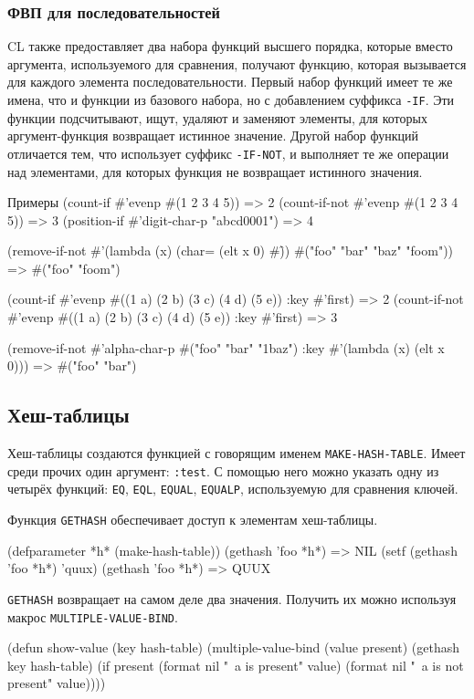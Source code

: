 \subsubsection{ФВП для последовательностей}
CL также предоставляет два набора функций высшего порядка, которые вместо аргумента, используемого для сравнения, получают функцию, которая вызывается для каждого элемента последовательности. Первый набор функций имеет те же имена, что и функции из базового набора, но с добавлением суффикса \lstinline{-IF}. Эти функции подсчитывают, ищут, удаляют и заменяют элементы, для которых аргумент-функция возвращает истинное значение. Другой набор функций отличается тем, что использует суффикс \lstinline{-IF-NOT}, и выполняет те же операции над элементами, для которых функция не возвращает истинного значения.
\begin{cllst}{Примеры}{}
(count-if #'evenp #(1 2 3 4 5))         => 2
(count-if-not #'evenp #(1 2 3 4 5))     => 3
(position-if #'digit-char-p "abcd0001") => 4

(remove-if-not #'(lambda (x) (char= (elt x 0) #\f))
  #("foo" "bar" "baz" "foom")) => #("foo" "foom")

(count-if #'evenp #((1 a) (2 b) (3 c) (4 d) (5 e)) :key #'first)     => 2
(count-if-not #'evenp #((1 a) (2 b) (3 c) (4 d) (5 e)) :key #'first) => 3

(remove-if-not #'alpha-char-p
  #("foo" "bar" "1baz") :key #'(lambda (x) (elt x 0))) => #("foo" "bar")
\end{cllst}

\subsection{Хеш-таблицы}
Хеш-таблицы создаются функцией с говорящим именем \lstinline{MAKE-HASH-TABLE}. Имеет среди прочих один аргумент: \lstinline{:test}. С помощью него можно указать одну из четырёх функций: \lstinline{EQ}, \lstinline{EQL}, \lstinline{EQUAL}, \lstinline{EQUALP}, используемую для сравнения ключей.

Функция \lstinline{GETHASH} обеспечивает доступ к элементам хеш-таблицы.
\begin{cllst}{}{}
(defparameter *h* (make-hash-table))
(gethash 'foo *h*) => NIL
(setf (gethash 'foo *h*) 'quux)
(gethash 'foo *h*) => QUUX
\end{cllst}

\lstinline{GETHASH} возвращает на самом деле два значения. Получить их можно используя макрос \lstinline{MULTIPLE-VALUE-BIND}.
\begin{cllst}{}{}
(defun show-value (key hash-table)
  (multiple-value-bind (value present) (gethash key hash-table)
    (if present
      (format nil "~a is present" value)
      (format nil "~a is not present" value))))
\end{cllst}

